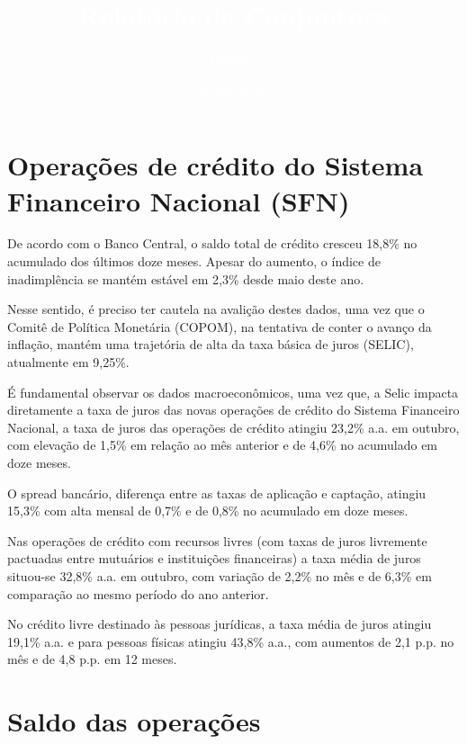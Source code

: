 \documentclass[100,a4paperpaper,]{article}
\title{\textbf{\textcolor{white}{Relatório de Conjuntura}}}
\author{\textbf{\textcolor{white}{Crédito}}}
\date{\textbf{\textcolor{white}{Outubro/2021}}}
\begin{document}
\renewcommand{\contentsname}{Sumário}


\maketitle
\tableofcontents
\clearpage

\section{Operações de crédito do Sistema Financeiro Nacional (SFN)} 
 \vspace{0.5cm}

De acordo com o Banco Central, o saldo total de crédito cresceu 18,8\%
no acumulado dos últimos doze meses. Apesar do aumento, o índice de
inadimplência se mantém estável em 2,3\% desde maio deste ano.

Nesse sentido, é preciso ter cautela na avalição destes dados, uma vez
que o Comitê de Política Monetária (COPOM), na tentativa de conter o
avanço da inflação, mantém uma trajetória de alta da taxa básica de
juros (SELIC), atualmente em 9,25\%.

É fundamental observar os dados macroeconômicos, uma vez que, a Selic
impacta diretamente a taxa de juros das novas operações de crédito do
Sistema Financeiro Nacional, a taxa de juros das operações de crédito
atingiu 23,2\% a.a. em outubro, com elevação de 1,5\% em relação ao mês
anterior e de 4,6\% no acumulado em doze meses.

O spread bancário, diferença entre as taxas de aplicação e captação,
atingiu 15,3\% com alta mensal de 0,7\% e de 0,8\% no acumulado em doze
meses.

Nas operações de crédito com recursos livres (com taxas de juros
livremente pactuadas entre mutuários e instituições financeiras) a taxa
média de juros situou-se 32,8\% a.a. em outubro, com variação de 2,2\%
no mês e de 6,3\% em comparação ao mesmo período do ano anterior.

No crédito livre destinado às pessoas jurídicas, a taxa média de juros
atingiu 19,1\% a.a. e para pessoas físicas atingiu 43,8\% a.a., com
aumentos de 2,1 p.p. no mês e de 4,8 p.p. em 12 meses.

\newpage

\section{Saldo das operações} 
 \vspace{0,25cm}
\end{document}
